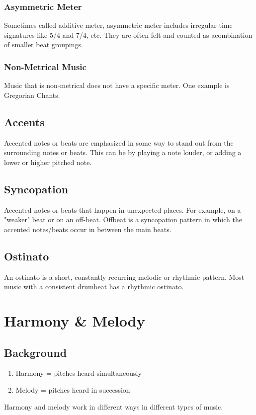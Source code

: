 \documentclass[12pt, a4paper]{report}
\begin{document}
  \subsection{Asymmetric Meter}

  Sometimes called additive meter, asymmetric meter includes irregular time signatures like 5/4 and 7/4, etc. They are often felt and counted as  acombination of smaller beat groupings.

  \subsection{Non-Metrical Music}

  Music that is non-metrical does not have a specific meter. One example is Gregorian Chants.

  \section{Accents}

  Accented notes or beats are emphasized in some way to stand out from the surrounding notes or beats. This can be by playing a note louder, or adding a lower or higher pitched note.

  \section{Syncopation}

  Accented notes or beats that happen in unexpected places. For example, on a "weaker" beat or on an off-beat. Offbeat is a syncopation pattern in which the accented notes/beats occur in between the main beats.

  \section{Ostinato}

  An ostinato is a short, constantly recurring melodic or rhythmic pattern. Most music with a consistent drumbeat has a rhythmic ostinato.







  \chapter{Harmony \& Melody}
  \section{Background}
  \begin{enumerate}
    \item Harmony = pitches heard simultaneously
    \item Melody = pitches heard in succession
  \end{enumerate}
  Harmony and melody work in different ways in different types of music.
\end{document}
